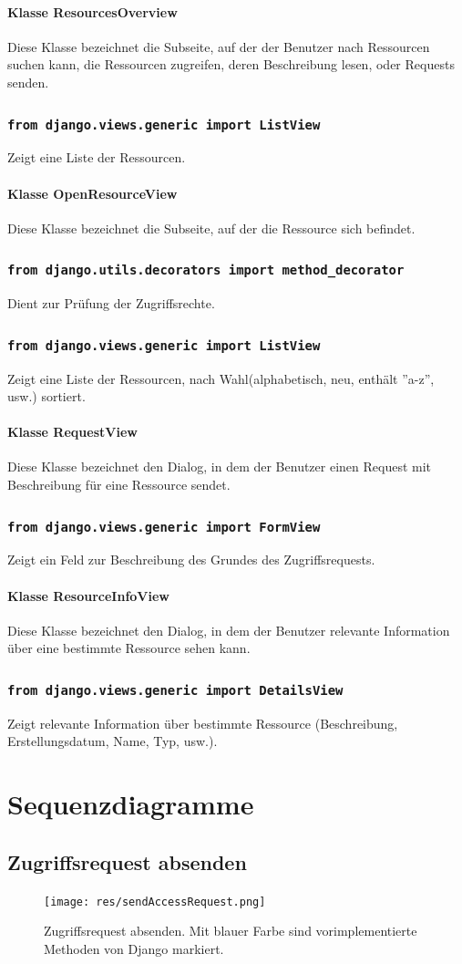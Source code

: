 \documentclass[parskip=full,11pt]{scrartcl}
\newcommand{\class}[1]{\subsubsection*{\lstinline[basicstyle=\ttfamily\large]{#1}}}
\begin{document}
\paragraph*{Klasse ResourcesOverview}
Diese Klasse bezeichnet die Subseite, auf der der Benutzer nach Ressourcen suchen kann, die Ressourcen zugreifen, deren Beschreibung lesen, oder Requests senden.
\class{from django.views.generic import ListView}
Zeigt eine Liste der Ressourcen.

\paragraph*{Klasse OpenResourceView}
Diese Klasse bezeichnet die Subseite, auf der die Ressource sich befindet.
\class{from django.utils.decorators import method_decorator}
Dient zur Prüfung der Zugriffsrechte.
\class{from django.views.generic import ListView}
Zeigt eine Liste der Ressourcen, nach Wahl(alphabetisch, neu, enthält ''a-z'', usw.) sortiert.

\paragraph*{Klasse RequestView}
Diese Klasse bezeichnet den Dialog, in dem der Benutzer einen Request mit Beschreibung für eine Ressource sendet.
\class{from django.views.generic import FormView}
Zeigt ein Feld zur Beschreibung des Grundes des Zugriffsrequests.

\paragraph*{Klasse ResourceInfoView}
Diese Klasse bezeichnet den Dialog, in dem der Benutzer relevante Information über eine bestimmte Ressource sehen kann.
\class{from django.views.generic import DetailsView}
Zeigt relevante Information über bestimmte Ressource (Beschreibung, Erstellungsdatum, Name, Typ, usw.).
\newpage
 \section{Sequenzdiagramme}
 \subsection{Zugriffsrequest absenden}
 \begin{figure}[ht!]
 	\centering
 	\texttt{[image: res/sendAccessRequest.png]}
 	\caption{Zugriffsrequest absenden. Mit blauer Farbe sind vorimplementierte Methoden von Django markiert.}
 	\label{fig:sendAccReq}
 \end{figure}
 
\end{document}
